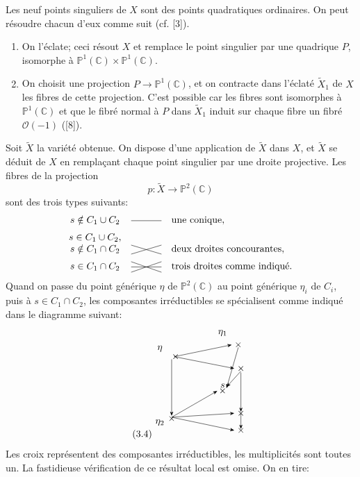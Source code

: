 \documentclass[10pt]{article}
\newcommand{\C}{\mathbb C}
\newcommand{\Pj}{\mathbb P}
\begin{document}
Les neuf points singuliers de \(X\) sont des points quadratiques ordinaires. On peut résoudre chacun d'eux comme suit (cf. [3]).
\begin{enumerate}[label=\alph*)]
\item On l'éclate; ceci résout \(X\) et remplace le point singulier par une quadrique \(P\), isomorphe à \(\Pj^1(\C)\times\Pj^1(\C)\).
\item On choisit une projection \(P\to\Pj^1(\C)\), et on contracte dans l'éclaté \(\widetilde X_1\) de \(X\) les fibres de cette projection. C'est possible car les fibres sont isomorphes à \(\Pj^1(\C)\) et que le fibré normal à \(P\) dans \(\widetilde X_1\) induit sur chaque fibre un fibré \(\mathcal O(-1)\) ([8]).
\end{enumerate}
Soit \(\widetilde X\) la variété obtenue. On dispose d'une application de \(\widetilde X\) dans \(X\), et \(\widetilde X\) se déduit de \(X\) en remplaçant chaque point singulier par une droite projective. Les fibres de la projection
\[
p:\widetilde X\longrightarrow\Pj^2(\C)
\]
sont des trois types suivants:
\[
\begin{array}{ccl}
s\notin C_1\cup C_2 & \begin{tikzpicture}[baseline=-0.5ex,scale=.55]\draw (-1,0)--(1,0);\end{tikzpicture} & \text{une conique},\\[0.6em]
s\in C_1\cup C_2,\\ s\notin C_1\cap C_2 & \begin{tikzpicture}[baseline=-0.5ex,scale=.55]\draw (-1,-.3)--(1,.3);\draw (-1,.3)--(1,-.3);\end{tikzpicture} & \text{deux droites concourantes},\\[0.6em]
s\in C_1\cap C_2 & \begin{tikzpicture}[baseline=-0.5ex,scale=.55]\draw (-1,-.35)--(1,.35);\draw (-1,.35)--(1,-.35);\draw (-1,0)--(1,0);\end{tikzpicture} & \text{trois droites comme indiqué.}
\end{array}
\]
Quand on passe du point générique \(\eta\) de \(\Pj^2(\C)\) au point générique \(\eta_i\) de \(C_i\), puis à \(s\in C_1\cap C_2\), les composantes irréductibles se spécialisent comme indiqué dans le diagramme suivant:
\[
\tag{3.4}
\begin{tikzpicture}[scale=0.95,>=Stealth]
\node at (0,1.4) {$\eta$};
\node at (2.4,2.0) {$\eta_1$};
\node at (0,-1.4) {$\eta_2$};
\node at (2.4,0) {$s$};
\foreach \x/\y in {0.6/1.1,3.0/1.55,3.1/.65,2.4/-.2,0.45/-1.25,3.1/-1.05,3.1/-1.7}{\node at (\x,\y) {$\times$};}
\draw[->] (0.55,1.1)--(2.75,1.55);
\draw[->] (0.55,1.1)--(2.85,.65);
\draw[->] (0.45,-1.2)--(2.2,-.2);
\draw[->] (0.45,-1.2)--(2.85,-1.05);
\draw[->] (0.45,-1.2)--(2.85,-1.7);
\draw[->] (3.0,1.45)--(2.55,-.1);
\draw[->] (3.1,.55)--(2.55,-.05);
\draw[->] (3.1,.5)--(3.1,-1.0);
\draw[->] (3.1,-1.05)--(3.1,-1.65);
\draw[->] (0.45,1.0)--(0.45,-1.15);
\end{tikzpicture}
\]
Les croix représentent des composantes irréductibles, les multiplicités sont toutes un. La fastidieuse vérification de ce résultat local est omise. On en tire:
\end{document}
